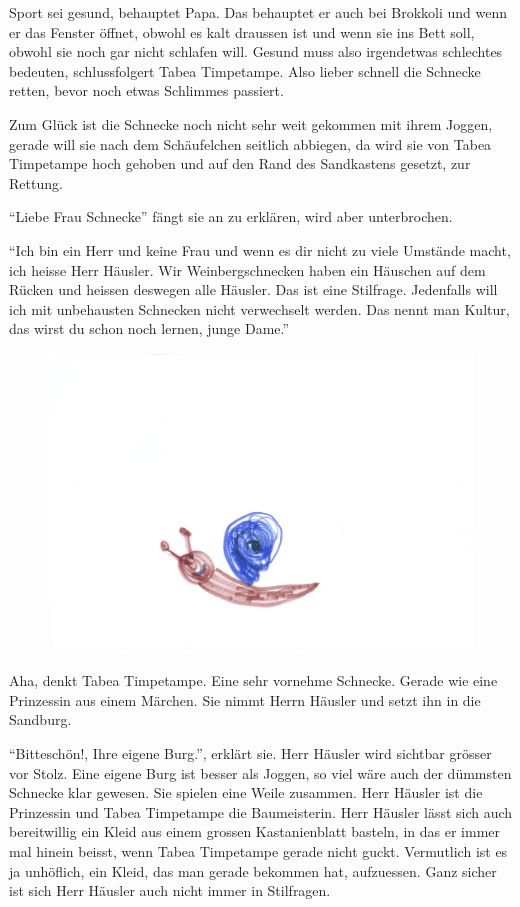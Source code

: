 Sport sei gesund, behauptet Papa. Das behauptet er auch bei Brokkoli und wenn er das Fenster öffnet, obwohl es kalt draussen ist und wenn sie ins Bett soll, obwohl sie noch gar nicht schlafen will. Gesund muss also irgendetwas schlechtes bedeuten, schlussfolgert Tabea Timpetampe. Also lieber schnell die Schnecke retten, bevor noch etwas Schlimmes passiert.

Zum Glück ist die Schnecke noch nicht sehr weit gekommen mit ihrem Joggen, gerade will sie nach dem Schäufelchen seitlich abbiegen, da wird sie von Tabea Timpetampe hoch gehoben und auf den Rand des Sandkastens gesetzt, zur Rettung. 

\enquote{Liebe Frau Schnecke} fängt sie an zu erklären, wird aber unterbrochen.

\enquote{Ich bin ein Herr und keine Frau und wenn es dir nicht zu viele Umstände macht, ich heisse Herr Häusler. Wir Weinbergschnecken haben ein Häuschen auf dem Rücken und heissen deswegen alle Häusler. Das ist eine Stilfrage. Jedenfalls will ich mit unbehausten Schnecken nicht verwechselt werden. Das nennt man Kultur, das wirst du schon noch lernen, junge Dame.}
\begin{figure}[h]
\centering
\includegraphics[width=.7\textwidth]{bilder/1schnecke.pdf}
\end{figure}

Aha, denkt Tabea Timpetampe. Eine sehr vornehme Schnecke. Gerade wie eine Prinzessin aus einem Märchen. Sie nimmt Herrn Häusler und setzt ihn in die Sandburg.

\enquote{Bitteschön!, Ihre eigene Burg.}, erklärt sie. Herr Häusler wird sichtbar grösser vor Stolz. Eine eigene Burg ist besser als Joggen, so viel wäre auch der dümmsten Schnecke klar gewesen. Sie spielen eine Weile zusammen. Herr Häusler ist die Prinzessin und Tabea Timpetampe die Baumeisterin. Herr Häusler lässt sich auch bereitwillig ein Kleid aus einem grossen Kastanienblatt basteln, in das er immer mal hinein beisst, wenn Tabea Timpetampe gerade nicht guckt. Vermutlich ist es ja unhöflich, ein Kleid, das man gerade bekommen hat, aufzuessen. Ganz sicher ist sich Herr Häusler auch nicht immer in Stilfragen.

